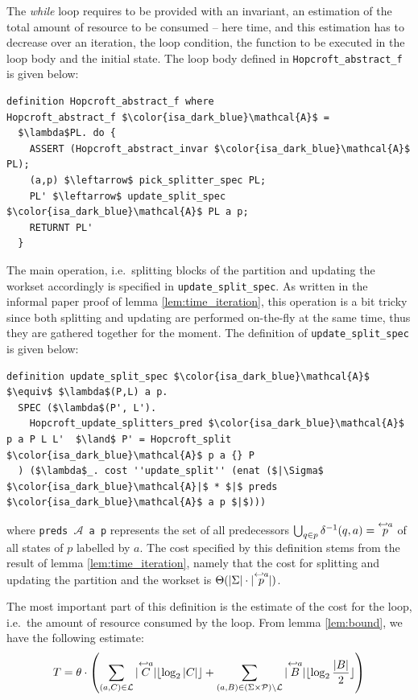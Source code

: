 \documentclass[12pt, a4 paper]{article}
\theoremstyle{definition}
\begin{document}
The \textit{while} loop requires to be provided with an invariant, an estimation of the total amount of resource to be consumed -- here time, and this estimation has to decrease over an iteration, the loop condition, the function to be executed in the loop body and the initial state.
The loop body defined in \texttt{Hopcroft\_abstract\_f} is given below:

\noindent
\begin{minipage}{\linewidth}
\begin{lstlisting}[language=Isabelle]
definition Hopcroft_abstract_f where
Hopcroft_abstract_f $\color{isa_dark_blue}\mathcal{A}$ = 
  $\lambda$PL. do {
    ASSERT (Hopcroft_abstract_invar $\color{isa_dark_blue}\mathcal{A}$ PL);                             
    (a,p) $\leftarrow$ pick_splitter_spec PL;
    PL' $\leftarrow$ update_split_spec $\color{isa_dark_blue}\mathcal{A}$ PL a p;
    RETURNT PL'
  }
\end{lstlisting}
\end{minipage}

The main operation, i.e.\ splitting blocks of the partition and updating the workset accordingly is specified in \texttt{update\_split\_spec}.
As written in the informal paper proof of lemma \ref{lem:time_iteration}, this operation is a bit tricky since both splitting and updating are performed on-the-fly at the same time, thus they are gathered together for the moment.
The definition of \texttt{update\_split\_spec} is given below:

\begin{lstlisting}[language=Isabelle]
definition update_split_spec $\color{isa_dark_blue}\mathcal{A}$ $\equiv$ $\lambda$(P,L) a p.
  SPEC ($\lambda$(P', L').
    Hopcroft_update_splitters_pred $\color{isa_dark_blue}\mathcal{A}$ p a P L L'  $\land$ P' = Hopcroft_split $\color{isa_dark_blue}\mathcal{A}$ p a {} P
  ) ($\lambda$_. cost ''update_split'' (enat ($|\Sigma$ $\color{isa_dark_blue}\mathcal{A}|$ * $|$ preds $\color{isa_dark_blue}\mathcal{A}$ a p $|$)))
\end{lstlisting}
where \texttt{preds $\mathcal{A}$ a p} represents the set of all predecessors $\bigcup_{q \in p} \delta^{-1}(q, a) = \overset{\hookleftarrow {a}}{p}$ of all states of $p$ labelled by $a$. The cost specified by this definition stems from the result of lemma \ref{lem:time_iteration}, namely that the cost for splitting and updating the partition and the workset is $\Theta(|\Sigma| \cdot |\overset{\hookleftarrow {a}}{p}|)$.

\bigskip

The most important part of this definition is the estimate of the cost for the loop, i.e.\ the amount of resource consumed by the loop. From lemma \ref{lem:bound}, we have the following estimate:
\begin{equation}\label{eq:estimate}
    T = \theta \cdot \left(\sum_{(a, C) \in \mathcal{L}} | \overset{\hookleftarrow {a}}{C} | \lfloor \log_2 | C | \rfloor + \sum_{(a, B) \in (\Sigma\times \mathcal{P})\setminus \mathcal{L}} | \overset{\hookleftarrow {a}}{B} | \lfloor \log_2 \frac{| B |}{2} \rfloor \right)
\end{equation}
\end{document}
